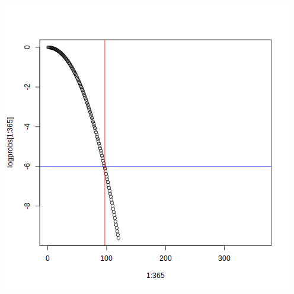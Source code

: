 \documentclass[11pt]{article}
\begin{document}
\begin{center}
\includegraphics[width=.9\linewidth]{plot.png}
\end{center}
\end{document}
